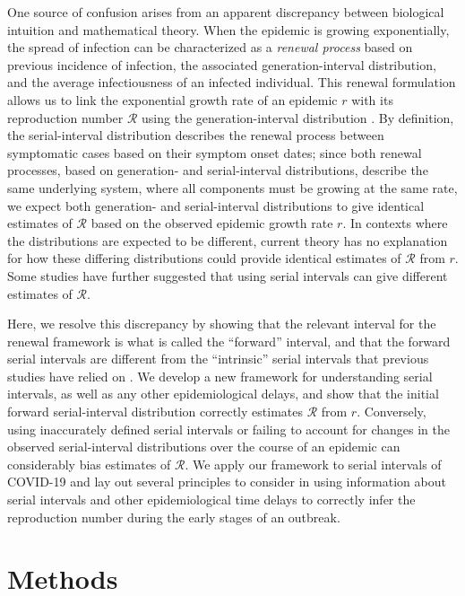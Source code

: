 \documentclass[12pt]{article}
\newcommand{\RR}{\ensuremath{{\mathcal R}}\xspace}
\begin{document}
One source of confusion arises from an apparent discrepancy between biological intuition and mathematical theory.
When the epidemic is growing exponentially, the spread of infection can be characterized as a \emph{renewal process} based on previous incidence of infection, the associated generation-interval distribution, and the average infectiousness of an infected individual.
This renewal formulation allows us to link the exponential growth rate of an epidemic $r$ with its reproduction number \RR using the generation-interval distribution \citep{wallinga2007generation}.
By definition, the serial-interval distribution describes the renewal process between symptomatic cases based on their symptom onset dates;
since both renewal processes, based on generation- and serial-interval distributions, describe the same underlying system, where all components must be growing at the same rate, we expect both generation- and serial-interval distributions to give identical estimates of \RR based on the observed epidemic growth rate $r$.
In contexts where the distributions are expected to be different, current theory has no explanation for how these differing distributions could provide identical estimates of \RR from $r$. 
Some studies have further suggested that using serial intervals can give different estimates of \RR \citep{britton2019estimation, ganyani2020estimating}.

Here, we resolve this discrepancy by showing that the relevant interval for the renewal framework is what is called the ``forward'' interval, and that the forward serial intervals are different from the ``intrinsic'' serial intervals that previous studies have relied on \citep{svensson2007note,klinkenberg2011correlation,te2013estimating,champredon2018equivalence, britton2019estimation}.
We develop a new framework for understanding serial intervals, as well as any other epidemiological delays, and show that the initial forward serial-interval distribution correctly estimates \RR from $r$.
Conversely, using inaccurately defined serial intervals or failing to account for changes in the observed serial-interval distributions over the course of an epidemic can considerably bias estimates of \RR.
We apply our framework to serial intervals of COVID-19 and lay out several principles to consider in using information about serial intervals and other epidemiological time delays to correctly infer the reproduction number during the early stages of an outbreak.

\section{Methods}
\end{document}
